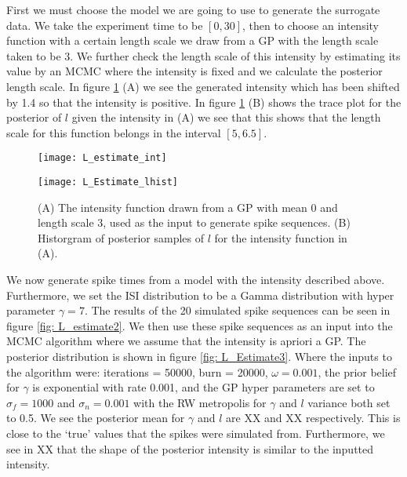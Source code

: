 \documentclass[../main.tex]{subfiles}
\begin{document}
First we must choose the model we are going to use to generate the surrogate data. We take the experiment time to be $[0,30]$, then to choose an intensity function with a certain length scale we draw from a GP with the length scale taken to be 3. We further check the length scale of this intensity by estimating its value by an MCMC where the intensity is fixed and we calculate the posterior length scale. In figure \ref{fig: L_Estimate1} (A) we see the generated intensity which has been shifted by 1.4 so that the intensity is positive. In figure \ref{fig: L_Estimate1} (B) shows the trace plot for the posterior of $l$ given the intensity in (A) we see that this shows that the length scale for this function belongs in the interval $[5, 6.5]$. 

\begin{figure}
	\begin{subfloat}[]{
	\texttt{[image: L\_estimate\_int]}}
	\end{subfloat}
	\begin{subfloat}[]{
	\texttt{[image: L\_Estimate\_lhist]}}
	\end{subfloat}	
		\caption{(A) The intensity function drawn from a GP with mean 0 and length scale 3, used as the input to generate spike sequences. (B) Historgram of posterior samples of $l$ for the intensity function in (A). }
\label{fig: L_Estimate1}
\end{figure}

We now generate spike times from a model with the intensity described above. Furthermore, we set the ISI distribution to be a Gamma distribution with hyper parameter $\gamma = 7$. The results of the 20 simulated spike sequences can be seen in figure \ref{fig: L_estimate2}. We then use these spike sequences as an input into the MCMC algorithm where we assume that the intensity is apriori a GP. The posterior distribution is shown in figure \ref{fig: L_Estimate3}. Where the inputs to the algorithm were: iterations = 50000, burn = 20000, $\omega = 0.001$, the prior belief for $\gamma$ is exponential with rate 0.001, and the GP hyper parameters are set to $\sigma_f = 1000$ and $\sigma_n = 0.001$ with the RW metropolis for $\gamma$ and $l$ variance both set to 0.5. We see the posterior mean for $\gamma$ and $l$ are XX and XX respectively. This is close to the `true' values that the spikes were simulated from. Furthermore, we see in XX that the shape of the posterior intensity is similar to the inputted intensity. %
\end{document}
